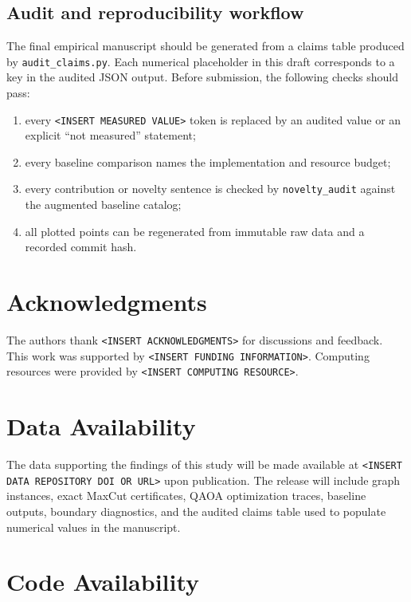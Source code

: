 \documentclass[reprint,aps,longbibliography]{revtex4-2}
\begin{document}
\subsection{Audit and reproducibility workflow}

The final empirical manuscript should be generated from a claims table produced by \texttt{audit\_claims.py}. Each numerical placeholder in this draft corresponds to a key in the audited JSON output. Before submission, the following checks should pass:
\begin{enumerate}[label=(\roman*)]
\item every \texttt{<INSERT MEASURED VALUE>} token is replaced by an audited value or an explicit ``not measured'' statement;
\item every baseline comparison names the implementation and resource budget;
\item every contribution or novelty sentence is checked by \texttt{novelty\_audit} against the augmented baseline catalog;
\item all plotted points can be regenerated from immutable raw data and a recorded commit hash.
\end{enumerate}

\section*{Acknowledgments}

The authors thank \texttt{<INSERT ACKNOWLEDGMENTS>} for discussions and feedback. This work was supported by \texttt{<INSERT FUNDING INFORMATION>}. Computing resources were provided by \texttt{<INSERT COMPUTING RESOURCE>}.

\section*{Data Availability}

The data supporting the findings of this study will be made available at \texttt{<INSERT DATA REPOSITORY DOI OR URL>} upon publication. The release will include graph instances, exact MaxCut certificates, QAOA optimization traces, baseline outputs, boundary diagnostics, and the audited claims table used to populate numerical values in the manuscript.

\section*{Code Availability}
\end{document}
